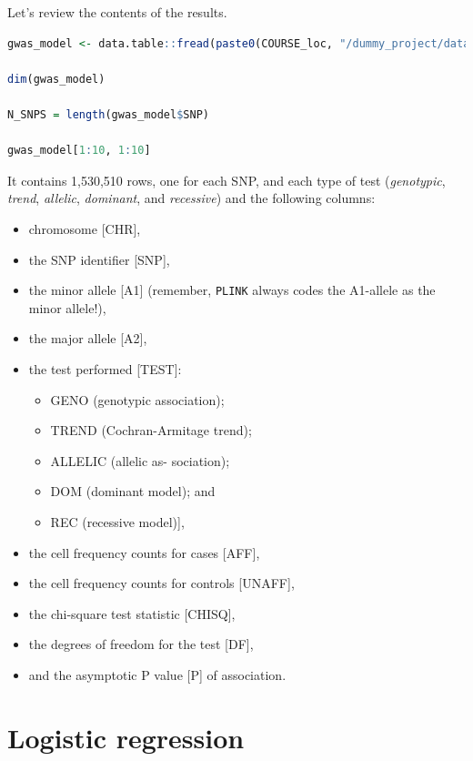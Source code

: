 \documentclass[
]{book}
\newcommand{\passthrough}[1]{#1}
\providecommand{\tightlist}{%
  \setlength{\itemsep}{0pt}\setlength{\parskip}{0pt}}
\begin{document}
Let's review the contents of the results.

\begin{lstlisting}[language=R]
gwas_model <- data.table::fread(paste0(COURSE_loc, "/dummy_project/data.model"))

dim(gwas_model)

N_SNPS = length(gwas_model$SNP)

gwas_model[1:10, 1:10]
\end{lstlisting}

It contains 1,530,510 rows, one for each SNP, and each type of test (\emph{genotypic}, \emph{trend}, \emph{allelic}, \emph{dominant}, and \emph{recessive}) and the following columns:

\begin{itemize}
\tightlist
\item
  chromosome {[}CHR{]},
\item
  the SNP identifier {[}SNP{]},
\item
  the minor allele {[}A1{]} (remember, \passthrough{\lstinline!PLINK!} always codes the A1-allele as the minor allele!),
\item
  the major allele {[}A2{]},
\item
  the test performed {[}TEST{]}:

  \begin{itemize}
  \tightlist
  \item
    GENO (genotypic association);
  \item
    TREND (Cochran-Armitage trend);
  \item
    ALLELIC (allelic as- sociation);
  \item
    DOM (dominant model); and
  \item
    REC (recessive model){]},
  \end{itemize}
\item
  the cell frequency counts for cases {[}AFF{]},
\item
  the cell frequency counts for controls {[}UNAFF{]},
\item
  the chi-square test statistic {[}CHISQ{]},
\item
  the degrees of freedom for the test {[}DF{]},
\item
  and the asymptotic P value {[}P{]} of association.
\end{itemize}

\hypertarget{logistic-regression}{%
\section{Logistic regression}\label{logistic-regression}}
\end{document}
